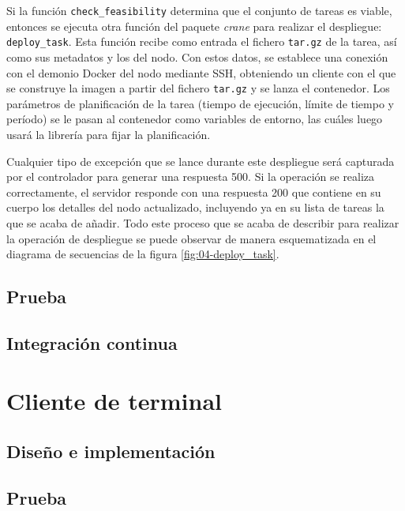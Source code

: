 \begin{itemize}
          Si la función \texttt{check\_feasibility} determina que el conjunto de
          tareas es viable, entonces se ejecuta otra función del paquete
          \textit{crane} para realizar el despliegue: \texttt{deploy\_task}.
          Esta función recibe como entrada el fichero \texttt{tar.gz} de la
          tarea, así como sus metadatos y los del nodo. Con estos datos, se
          establece una conexión con el demonio Docker del nodo mediante SSH,
          obteniendo un cliente con el que se construye la imagen a partir del
          fichero \texttt{tar.gz} y se lanza el contenedor. Los parámetros de
          planificación de la tarea (tiempo de ejecución, límite de tiempo y
          período) se le pasan al contenedor como variables de entorno, las
          cuáles luego usará la librería para fijar la planificación.

          Cualquier tipo de excepción que se lance durante este despliegue será
          capturada por el controlador para generar una respuesta 500. Si la
          operación se realiza correctamente, el servidor responde con una
          respuesta 200 que contiene en su cuerpo los detalles del nodo
          actualizado, incluyendo ya en su lista de tareas la que se acaba de
          añadir. Todo este proceso que se acaba de describir para realizar la
          operación de despliegue se puede observar de manera esquematizada en
          el diagrama de secuencias de la figura \ref{fig:04-deploy_task}.
\end{itemize}

\subsection{Prueba}

\subsection{Integración continua}

\section{Cliente de terminal}

\subsection{Diseño e implementación}

\subsection{Prueba}

